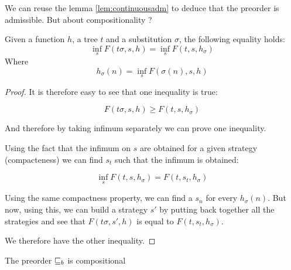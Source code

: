 We can reuse the lemma \ref{lem:continuousadm} to deduce 
that the preorder is admissible. But about compositionality ?

\begin{alemma}[Decomposition]
    \label{lem:mixeddecomposition}
    Given a function $h$, a tree $t$ and a substitution $\sigma$,
    the following equality holds:
    \begin{equation*}
        \inf_s F(t\sigma ,s,h) = \inf_s F(t,s,h_\sigma)
    \end{equation*}
    Where
    \begin{equation*}
        h_\sigma (n) = \inf_s F(\sigma(n),s,h)
    \end{equation*}
\end{alemma}

\begin{proof}
    It is therefore easy to see that 
    one inequality is true:

    \begin{equation*}
        F(t\sigma, s, h) \geq F (t,s,h_\sigma)
    \end{equation*}

    And therefore by taking infimum separately we can prove 
    one inequality.

    Using the fact that the infimum on $s$ are obtained 
    for a given strategy (compacteness) we can find $s_t$
    such that the infimum is obtained:
    
    \begin{equation*}
        \inf_s F (t,s,h_\sigma) = F(t,s_t, h_\sigma)
    \end{equation*}

    Using the same compactness property, we can find a $s_n$ for every 
    $h_\sigma (n)$. But now, using this, we can build 
    a strategy $s'$ by putting back together all the 
    strategies and see that $F(t\sigma, s', h)$ is 
    equal to $F(t, s_t, h_\sigma)$.

    We therefore have the other inequality.
\end{proof}

\begin{alemma}[Compositionality]
    The preorder $\sqsubseteq_b$ is compositional
\end{alemma}

